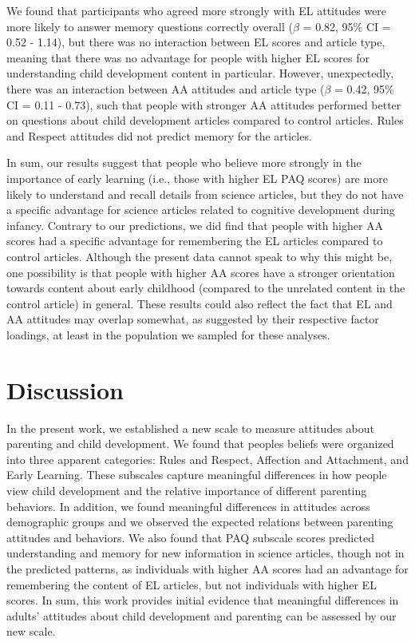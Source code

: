 \documentclass[floatsintext,man]{apa6}
\theoremstyle{definition}
\theoremstyle{definition}
\theoremstyle{definition}
\theoremstyle{remark}
\begin{document}
We found that participants who agreed more strongly with EL attitudes
were more likely to answer memory questions correctly overall (\(\beta\)
= 0.82, 95\% CI = 0.52 - 1.14), but there was no interaction between EL
scores and article type, meaning that there was no advantage for people
with higher EL scores for understanding child development content in
particular. However, unexpectedly, there was an interaction between AA
attitudes and article type (\(\beta\) = 0.42, 95\% CI = 0.11 - 0.73),
such that people with stronger AA attitudes performed better on
questions about child development articles compared to control articles.
Rules and Respect attitudes did not predict memory for the articles.

In sum, our results suggest that people who believe more strongly in the
importance of early learning (i.e., those with higher EL PAQ scores) are
more likely to understand and recall details from science articles, but
they do not have a specific advantage for science articles related to
cognitive development during infancy. Contrary to our predictions, we
did find that people with higher AA scores had a specific advantage for
remembering the EL articles compared to control articles. Although the
present data cannot speak to why this might be, one possibility is that
people with higher AA scores have a stronger orientation towards content
about early childhood (compared to the unrelated content in the control
article) in general. These results could also reflect the fact that EL
and AA attitudes may overlap somewhat, as suggested by their respective
factor loadings, at least in the population we sampled for these
analyses.

\section{Discussion}\label{discussion}

In the present work, we established a new scale to measure attitudes
about parenting and child development. We found that peoples beliefs
were organized into three apparent categories: Rules and Respect,
Affection and Attachment, and Early Learning. These subscales capture
meaningful differences in how people view child development and the
relative importance of different parenting behaviors. In addition, we
found meaningful differences in attitudes across demographic groups and
we observed the expected relations between parenting attitudes and
behaviors. We also found that PAQ subscale scores predicted
understanding and memory for new information in science articles, though
not in the predicted patterns, as individuals with higher AA scores had
an advantage for remembering the content of EL articles, but not
individuals with higher EL scores. In sum, this work provides initial
evidence that meaningful differences in adults' attitudes about child
development and parenting can be assessed by our new scale.
\end{document}
